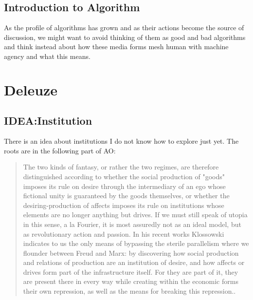\section{Introduction to Algorithm}\label{sec:Introduction to Algorithm} %

As the profile of algorithms has grown and as their actions become the source of discussion, we might want to avoid thinking of them as good and bad algorithms and think instead about how these media forms mesh human with machine agency and what this means.


\chapter{Deleuze}\label{chap:Deleuze} %

\section{IDEA:Institution}
\begin{commentenv}
	There is an idea about institutions I do not know how to explore just yet.
	The roots are in the following part of AO:


\end{commentenv}

\begin{quote}
	The two kinds of fantasy, or rather the two regimes, are therefore distinguished according to whether the social production of "goods" imposes its rule on desire through the intermediary of an ego whose fictional unity is guaranteed by the goods themselves, or whether the desiring-production of affects imposes its rule on institutions whose elements are no longer anything but drives. If we must still speak of utopia in this sense, a la Fourier, it is most assuredly not as an ideal model, but as revolutionary action and passion. In his recent works Klossowski indicates to us the only means of bypassing the sterile parallelism where we flounder between Freud and Marx: by discovering how social production and relations of production are an institution of desire, and how affects or drives form part of the infrastructure itself. For they are part of it, they are present there in every way while creating within the economic forms their own repression, as well as the means for breaking this repression.\cite[63]{deleuze1983}.
\end{quote}


